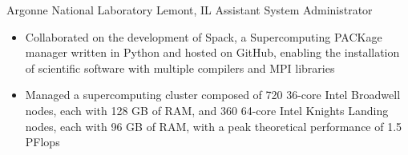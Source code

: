 
        {Argonne National Laboratory}
        {Lemont, IL}
        {Assistant System Administrator}
        {}{
    \begin{itemize}
        \item Collaborated on the development of Spack, a Supercomputing PACKage manager written
            in Python and hosted on GitHub, enabling the installation of scientific software with
            multiple compilers and MPI libraries
        \item Managed a supercomputing cluster composed of 720 36-core Intel Broadwell nodes,
            each with 128 GB of RAM, and 360 64-core Intel Knights Landing nodes, each with
            96 GB of RAM, with a peak theoretical performance of 1.5 PFlops
    \end{itemize}
}
